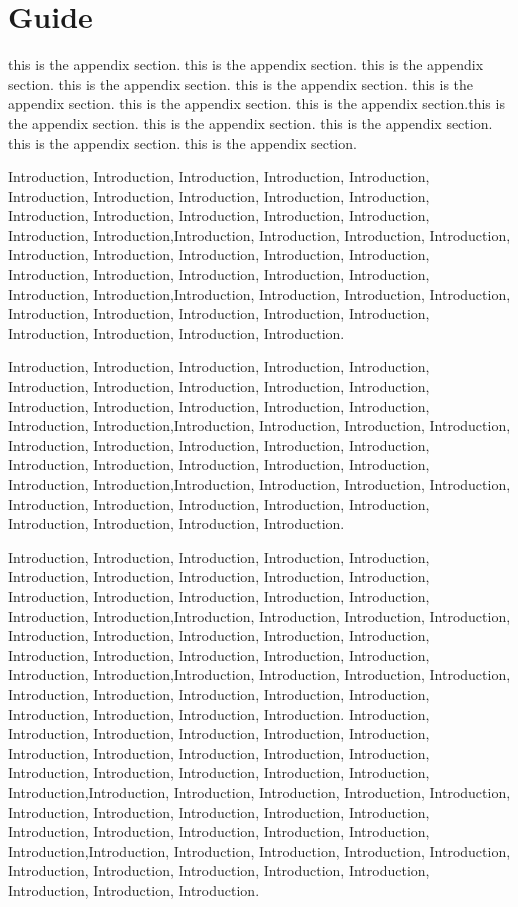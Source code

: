 
\chapter{Guide}
\label{chap:guide}

this is the appendix section. this is the appendix section. this is the appendix section. this is the appendix section. this is the appendix section. this is the appendix section. this is the appendix section. this is the appendix section.this is the appendix section. this is the appendix section. this is the appendix section. this is the appendix section. this is the appendix section.

Introduction, Introduction, Introduction, Introduction, Introduction, Introduction, Introduction, Introduction, Introduction, Introduction, Introduction, Introduction, Introduction, Introduction, Introduction, Introduction, Introduction,Introduction, Introduction, Introduction, Introduction, Introduction, Introduction, Introduction, Introduction, Introduction, Introduction, Introduction, Introduction, Introduction, Introduction, Introduction, Introduction,Introduction, Introduction, Introduction, Introduction, Introduction, Introduction, Introduction, Introduction, Introduction, Introduction, Introduction, Introduction, Introduction.

Introduction, Introduction, Introduction, Introduction, Introduction, Introduction, Introduction, Introduction, Introduction, Introduction, Introduction, Introduction, Introduction, Introduction, Introduction, Introduction, Introduction,Introduction, Introduction, Introduction, Introduction, Introduction, Introduction, Introduction, Introduction, Introduction, Introduction, Introduction, Introduction, Introduction, Introduction, Introduction, Introduction,Introduction, Introduction, Introduction, Introduction, Introduction, Introduction, Introduction, Introduction, Introduction, Introduction, Introduction, Introduction, Introduction.

Introduction, Introduction, Introduction, Introduction, Introduction, Introduction, Introduction, Introduction, Introduction, Introduction, Introduction, Introduction, Introduction, Introduction, Introduction, Introduction, Introduction,Introduction, Introduction, Introduction, Introduction, Introduction, Introduction, Introduction, Introduction, Introduction, Introduction, Introduction, Introduction, Introduction, Introduction, Introduction, Introduction,Introduction, Introduction, Introduction, Introduction, Introduction, Introduction, Introduction, Introduction, Introduction, Introduction, Introduction, Introduction, Introduction.
Introduction, Introduction, Introduction, Introduction, Introduction, Introduction, Introduction, Introduction, Introduction, Introduction, Introduction, Introduction, Introduction, Introduction, Introduction, Introduction, Introduction,Introduction, Introduction, Introduction, Introduction, Introduction, Introduction, Introduction, Introduction, Introduction, Introduction, Introduction, Introduction, Introduction, Introduction, Introduction, Introduction,Introduction, Introduction, Introduction, Introduction, Introduction, Introduction, Introduction, Introduction, Introduction, Introduction, Introduction, Introduction, Introduction.

